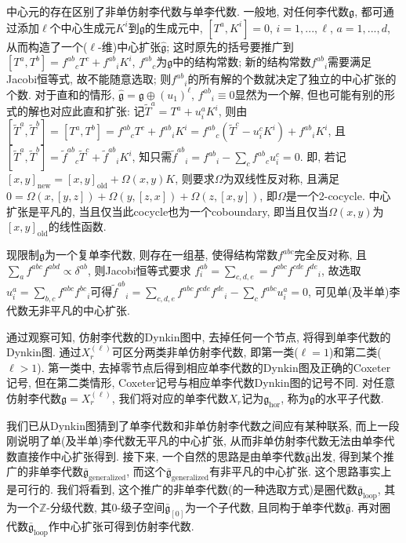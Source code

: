 \documentclass{ctexart}%
\theoremstyle{definition}
\theoremstyle{remark}
\begin{document}
中心元的存在区别了非单仿射李代数与单李代数. 一般地, 对任何李代数$\mathfrak{g}$, 都可通过添加$\ell$个中心生成元$K^i$到$\mathfrak{g}$的生成元中, $[T^a,K^i]=0$, $i=1,...,\ell$, $a=1,...,d$, 从而构造了一个($\ell$-维)中心扩张$\hat{\mathfrak{g}}$; 这时原先的括号要推广到$[T^a,T^b]=f^{ab}{}_c T^c+f^{ab}{}_i K^i$, $f^{ab}{}_c$为$\mathfrak{g}$中的结构常数; 新的结构常数$f^{ab}{}_i$需要满足Jacobi恒等式, 故不能随意选取; 则$f^{ab}{}_i$的所有解的个数就决定了独立的中心扩张的个数. 对于直和的情形, $\hat{\mathfrak{g}} = \mathfrak{g}\oplus (u_1)^{\ell}$, $f^{ab}{}_i\equiv 0$显然为一个解, 但也可能有别的形式的解也对应此直和扩张: 记$\tilde{T}^a=T^a+u^a_iK^i$, 则由$[\tilde{T}^a,\tilde{T}^b]=[T^a,T^b]=f^{ab}{}_c T^c +f^{ab}{}_i K^i= f^{ab}{}_c (\tilde{T}^c-u^c_i K^i)+ f^{ab}{}_i K^i$, 且$[\tilde{T}^a,\tilde{T}^b] = \tilde{f}^{ab}{}_c\tilde{T}^c+\tilde{f}^{ab}{}_i K^i$, 知只需$\tilde{f}^{ab}{}_i = f^{ab}{}_i - \sum_c f^{ab}{}_c u^c_i = 0$. 即, 若记$[x,y]_{\text{new}}=[x,y]_{\text{old}} + \Omega(x,y)K$, 则要求$\Omega$为双线性反对称, 且满足$0=\Omega(x,[y,z])+\Omega(y,[z,x])+\Omega(z,[x,y])$, 即$\Omega$是一个2-cocycle. 中心扩张是平凡的, 当且仅当此cocycle也为一个coboundary, 即当且仅当$\Omega(x,y)$为$[x,y]_{\text{old}}$的线性函数. 

现限制$\mathfrak{g}$为一个复单李代数, 则存在一组基, 使得结构常数$f^{abc}$完全反对称, 且$\sum_a f^{abc}f^{abd}\propto \delta^{ab}$, 则Jacobi恒等式要求
$f^{ab}_i = \sum_{c,d,e} = f^{abc}f^{cde}f^{de}{}_i$, 故选取$u^a_i = \sum_{b,c} f^{abc} f^{bc}{}_i$可得$\tilde{f}^{ab}{}_i = \sum_{c,d,e} f^{abc}f^{cde}f^{de}{}_i-\sum_c f^{abc} u^a_i = 0$, 可见单(及半单)李代数无非平凡的中心扩张.


通过观察可知, 仿射李代数的Dynkin图中, 去掉任何一个节点, 将得到单李代数的Dynkin图. 通过$X_r^{(\ell)}$可区分两类非单仿射李代数, 即第一类($\ell=1$)和第二类($\ell >1$). 第一类中, 去掉零节点后得到相应单李代数的Dynkin图及正确的Coxeter记号, 但在第二类情形, Coxeter记号与相应单李代数Dynkin图的记号不同. 对任意仿射李代数$\mathfrak{g}=X^{(\ell)}_r$, 我们将对应的单李代数$X_r$记为$\mathfrak{g}_{\text{hor}}$, 称为$\mathfrak{g}$的水平子代数. 


我们已从Dynkin图猜到了单李代数和非单仿射李代数之间应有某种联系, 而上一段刚说明了单(及半单)李代数无平凡的中心扩张, 从而非单仿射李代数无法由单李代数直接作中心扩张得到. 接下来, 一个自然的思路是由单李代数$\bar{\mathfrak{g}}$出发, 得到某个推广的非单李代数$\bar{\mathfrak{g}}_{\text{generalized}}$, 而这个$\bar{\mathfrak{g}}_{\text{generalized}}$有非平凡的中心扩张. 这个思路事实上是可行的. 我们将看到, 这个推广的非单李代数(的一种选取方式)是圈代数$\bar{\mathfrak{g}}_{\text{loop}}$, 其为一个$\mathbb{Z}$-分级代数, 其0-级子空间$\bar{\mathfrak{g}}_{[0]}$为一个子代数, 且同构于单李代数$\bar{\mathfrak{g}}$. 再对圈代数$\bar{\mathfrak{g}}_{\text{loop}}$作中心扩张可得到仿射李代数.
\end{document}
